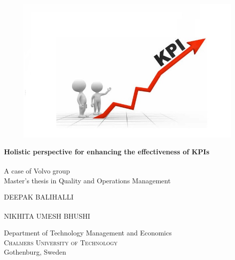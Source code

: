 
\begin{titlepage}
			
\addtolength{\voffset}{2cm}

\begin{figure}[H]
\centering
\vspace{2cm}	%
\includegraphics[width=0.9\linewidth]{figure/auxiliary/KPI-n2.jpg}
\end{figure}

\mbox{}
\vfill
\renewcommand{\familydefault}{\sfdefault} \normalfont %
\textbf{{\Huge Holistic perspective for enhancing the effectiveness of KPIs\\[0.2cm] }} 	\\[0.5cm]
{\Large A case of Volvo group}\\[0.5cm]
Master's thesis in Quality and Operations Management \setlength{\parskip}{1cm}

{\Large DEEPAK BALIHALLI} \setlength{\parskip}{2cm}\\
\\
{\Large NIKHITA UMESH BHUSHI} \setlength{\parskip}{2cm}

Department of Technology Management and Economics \\
\textsc{Chalmers University of Technology} \\
Gothenburg, Sweden \the\year

\renewcommand{\familydefault}{\rmdefault} \normalfont %
\end{titlepage}


